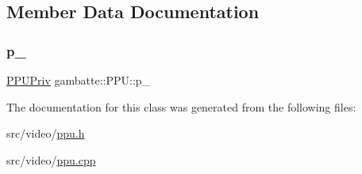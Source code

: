 \subsection{Member Data Documentation}
\mbox{\label{classgambatte_1_1PPU_a125f5c1050b1e30ba0da55dfe1fc121b}} 
\subsubsection{\texorpdfstring{p\+\_\+}{p\_}}
{\footnotesize\ttfamily \hyperlink{structgambatte_1_1PPUPriv}{P\+P\+U\+Priv} gambatte\+::\+P\+P\+U\+::p\+\_\+\hspace{0.3cm}{\ttfamily [private]}}



The documentation for this class was generated from the following files\+:\begin{DoxyCompactItemize}
\item 
src/video/\hyperlink{ppu_8h}{ppu.\+h}\item 
src/video/\hyperlink{ppu_8cpp}{ppu.\+cpp}\end{DoxyCompactItemize}
